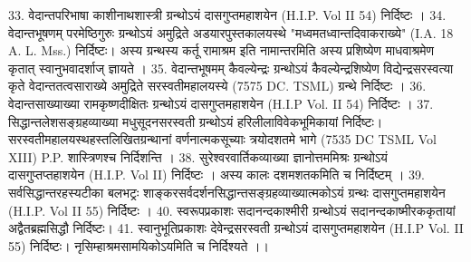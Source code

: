 33. वेदान्तपरिभाषा								काशीनाथशास्त्री
	ग्रन्थोऽयं दासगुप्तमहाशयेन (H.I.P. Vol II 54) निर्दिष्टः ।
34. वेदान्तभूषणम् 								परमेष्ठिगुरुः
	ग्रन्थोऽयं अमुद्रिते	अडयारपुस्तकालयस्थे "मध्वमतध्वान्तदिवाकराख्ये" (I.A. 18 A. L. Mss.) निर्दिष्टः। अस्य ग्रन्थस्य कर्तू रामाश्रम इति नामान्तरमिति अस्य प्रशिष्येण माधवाश्रमेण कृतात् स्वानुभवादर्शाज् ज्ञायते । 
35. वेदान्तभूषमम् 								कैवल्येन्द्रः
	ग्रन्थोऽयं कैवल्येन्द्रशिष्येण विद्येन्द्रसरस्वत्या कृते वेदान्ततत्वसाराख्ये अमुद्रिते सरस्वतीमहालयस्ये (7575 DC. TSML) ग्रन्थे निर्दिष्टः ।
36. वेदान्तसाख्याख्या							रामकृष्णदीक्षितः
	ग्रन्थोऽयं दासगुप्तमहाशयेन (H.I.P Vol. II 54) निर्दिष्टः ।
37. सिद्धान्तलेशसङ्‌ग्रहव्याख्या					मधुसूदनसरस्वती
	ग्रन्थोऽयं हरिलीलाविवेकभूमिकायां निर्दिष्टः। सरस्वतीमहालयस्थहस्तलिखितग्रन्थानां वर्णनात्मकसूच्याः त्रयोदशतमे भागे (7535 DC TSML Vol XIII) P.P. शास्त्रिणश्च निर्दिशन्ति । 
38. सुरेश्वरवार्तिकव्याख्या						ज्ञानोत्तममिश्रः
	ग्रन्थोऽयं दासगुप्तप्तहाशयेन (H.I.P. Vol II) निर्दिष्टः । अस्य कालः दशमशतकमिति च निर्दिष्टम् । 
39. सर्वसिद्धान्तरहस्यटीका						बलभट्रः
	शाङ्करसर्वदर्शनसिद्धान्तसङ्ग्रहव्याख्यात्मकोऽयं ग्रन्थः दासगुप्तमहाशयेन (H.I.P. Vol II 55) निर्दिष्टः । 
40. स्वरूपप्रकाशः								सदानन्दकाश्मीरी
	ग्रन्थोऽयं सदानन्दकाष्मीरककृतायां अद्वैतब्रह्मसिद्धौ निर्दिष्टः।
41. स्वानुभूतिप्रकाशः							देवेन्द्रसरस्वती 
	ग्रन्थोऽयं दासगुप्तमहाशयेन (H.I.P Vol. II 55) निर्दिष्टः। नृसिम्हाश्रमसामयिकोऽयमिति च निर्दिश्यते ।। 
